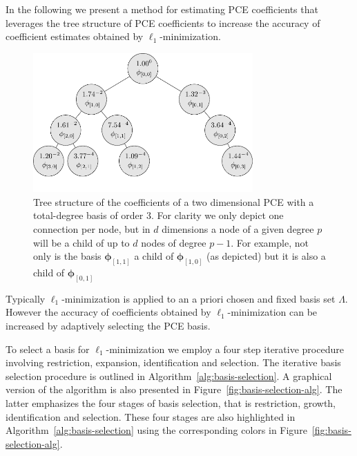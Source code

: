 In the following we present a method for estimating PCE coefficients that leverages the tree structure of 
PCE coefficients to increase the accuracy of coefficient estimates obtained by $\ell_1$-minimization.
\begin{figure}
\centering
\includegraphics[width=0.75\textwidth]{images/pce-tree.pdf}
\caption{Tree structure of the coefficients of a two dimensional PCE with a total-degree basis of order 3. For clarity we only depict one connection per node, but in $d$ dimensions a node of a given
degree $p$ will be a child of up to $d$ nodes of degree $p-1$. For example, not only is the basis $\boldsymbol{\phi}_{[1,1]}$ a child of $\boldsymbol{\phi}_{[1,0]}$ (as depicted) but it is
 also a child of $\boldsymbol{\phi}_{[0,1]}$} 
\label{fig:pce-tree}
\end{figure}

Typically $\ell_1$-minimization is applied to an a priori chosen and fixed basis set $\Lambda$. However the accuracy of coefficients obtained by $\ell_1$-minimization can be increased by
adaptively selecting the PCE basis.

To select a basis for $\ell_1$-minimization we employ a four step iterative procedure involving restriction, expansion, identification and selection. 
The iterative basis selection procedure is outlined in Algorithm~\ref{alg:basis-selection}. A graphical version of the algorithm is also presented in Figure~\ref{fig:basis-selection-alg}.
The latter emphasizes the four stages of basis selection, that is restriction, growth, identification and selection. These four stages are also highlighted in 
Algorithm~\ref{alg:basis-selection} using the corresponding colors in Figure~\ref{fig:basis-selection-alg}.

